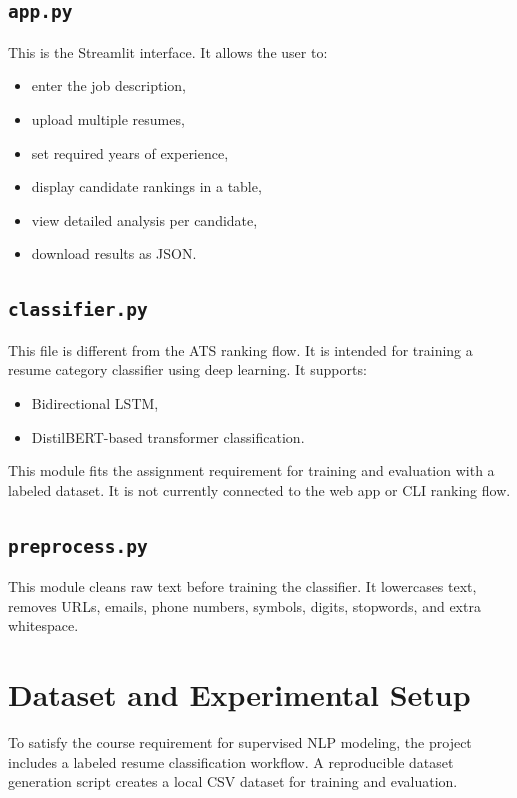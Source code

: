\documentclass[12pt,a4paper]{article}
\begin{document}
\subsection{\texttt{app.py}}
This is the Streamlit interface. It allows the user to:
\begin{itemize}[leftmargin=1.5em]
    \item enter the job description,
    \item upload multiple resumes,
    \item set required years of experience,
    \item display candidate rankings in a table,
    \item view detailed analysis per candidate,
    \item download results as JSON.
\end{itemize}

\subsection{\texttt{classifier.py}}
This file is different from the ATS ranking flow. It is intended for training a resume category classifier using deep learning. It supports:
\begin{itemize}[leftmargin=1.5em]
    \item Bidirectional LSTM,
    \item DistilBERT-based transformer classification.
\end{itemize}

This module fits the assignment requirement for training and evaluation with a labeled dataset. It is not currently connected to the web app or CLI ranking flow.

\subsection{\texttt{preprocess.py}}
This module cleans raw text before training the classifier. It lowercases text, removes URLs, emails, phone numbers, symbols, digits, stopwords, and extra whitespace.

\section{Dataset and Experimental Setup}
To satisfy the course requirement for supervised NLP modeling, the project includes a labeled resume classification workflow. A reproducible dataset generation script creates a local CSV dataset for training and evaluation.
\end{document}
